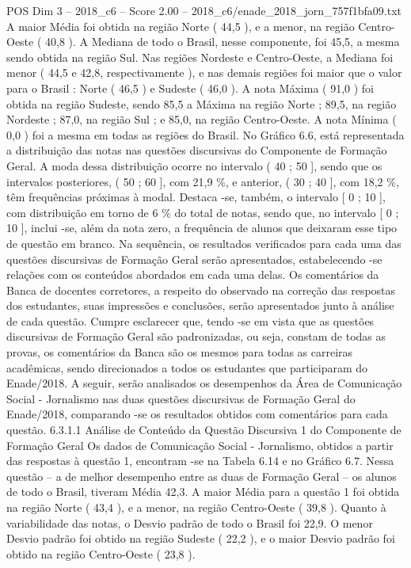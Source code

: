 \begin{textsample}{POS Dim 3 – 2018\_c6 – Score 2.00 – 2018\_c6/enade\_2018\_jorn\_757f1bfa09.txt}
A maior Média foi obtida na região Norte ( 44,5 ), e a menor, na região Centro-Oeste ( 40,8 ).
A Mediana de todo o Brasil, nesse componente, foi 45,5, a mesma sendo obtida na região Sul.
Nas regiões Nordeste e Centro-Oeste, a Mediana foi menor ( 44,5 e 42,8, respectivamente ), e nas demais regiões foi maior que o valor para o Brasil : Norte ( 46,5 ) e Sudeste ( 46,0 ).
A nota Máxima ( 91,0 ) foi obtida na região Sudeste, sendo 85,5 a Máxima na região Norte ; 89,5, na região Nordeste ; 87,0, na região Sul ; e 85,0, na região Centro-Oeste.
A nota Mínima ( 0,0 ) foi a mesma em todas as regiões do Brasil.
No Gráfico 6.6, está representada a distribuição das notas nas questões discursivas do Componente de Formação Geral.
A moda dessa distribuição ocorre no intervalo ( 40 ; 50 ], sendo que os intervalos posteriores, ( 50 ; 60 ], com 21,9 \%, e anterior, ( 30 ; 40 ], com 18,2 \%, têm frequências próximas à modal.
Destaca -se, também, o intervalo [ 0 ; 10 ], com distribuição em torno de 6 \% do total de notas, sendo que, no intervalo [ 0 ; 10 ], inclui -se, além da nota zero, a frequência de alunos que deixaram esse tipo de questão em branco.
Na sequência, os resultados verificados para cada uma das questões discursivas de Formação Geral serão apresentados, estabelecendo -se relações com os conteúdos abordados em cada uma delas.
Os comentários da Banca de docentes corretores, a respeito do observado na correção das respostas dos estudantes, suas impressões e conclusões, serão apresentados junto à análise de cada questão.
Cumpre esclarecer que, tendo -se em vista que as questões discursivas de Formação Geral são padronizadas, ou seja, constam de todas as provas, os comentários da Banca são os mesmos para todas as carreiras acadêmicas, sendo direcionados a todos os estudantes que participaram do Enade/2018.
A seguir, serão analisados os desempenhos da Área de Comunicação Social - Jornalismo nas duas questões discursivas de Formação Geral do Enade/2018, comparando -se os resultados obtidos com comentários para cada questão. 6.3.1.1 Análise de Conteúdo da Questão Discursiva 1 do Componente de Formação Geral Os dados de Comunicação Social - Jornalismo, obtidos a partir das respostas à questão 1, encontram -se na Tabela 6.14 e no Gráfico 6.7.
Nessa questão – a de melhor desempenho entre as duas de Formação Geral – os alunos de todo o Brasil, tiveram Média 42,3.
A maior Média para a questão 1 foi obtida na região Norte ( 43,4 ), e a menor, na região Centro-Oeste ( 39,8 ).
Quanto à variabilidade das notas, o Desvio padrão de todo o Brasil foi 22,9.
O menor Desvio padrão foi obtido na região Sudeste ( 22,2 ), e o maior Desvio padrão foi obtido na região Centro-Oeste ( 23,8 ).

\end{textsample}
